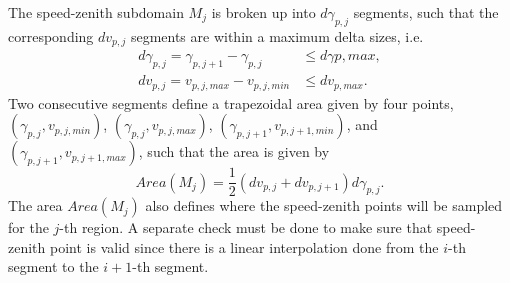 \documentclass{article}
\begin{document}
The speed-zenith subdomain $M_j$ is broken up into $d\gamma_{p,j}$ segments, such that the corresponding $dv_{p,j}$ segments are within a maximum delta sizes, i.e.\
\begin{align}
d\gamma_{p,j} = \gamma_{p,j+1} - \gamma_{p,j} &\le d\gamma{p,max},\\
dv_{p,j} = v_{p,j,max} - v_{p,j,min} &\le dv_{p,max}.
\end{align}
Two consecutive segments define a trapezoidal area given by four points, $(\gamma_{p,j}, v_{p,j,min})$, $(\gamma_{p,j}, v_{p,j,max})$,  $(\gamma_{p,j+1}, v_{p,j+1,min})$, and $(\gamma_{p,j+1}, v_{p,j+1,max})$, such that the area is given by
\begin{equation}
Area(M_j) = \frac{1}{2}(dv_{p,j} + dv_{p,j+1})d\gamma_{p,j}.
\end{equation}
The area $Area(M_j)$ also defines where the speed-zenith points will be sampled for the $j$-th region. A separate check must be done to make sure that speed-zenith point is valid since there is a linear interpolation done from the $i$-th segment to the $i+1$-th segment.
\end{document}
